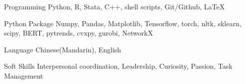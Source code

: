 

\begin{cvskills}

  \cvskill
    {Programming} %
    {Python, R, Stata, C++, shell scripts, Git/Github, \LaTeX} %

  \cvskill
    {Python Package} %
    {Numpy, Pandas, Matplotlib, Tensorflow, torch, nltk, sklearn, scipy, BERT, pytrends, cvxpy,
    gurobi, NetworkX}
    
  \cvskill
    {Language} %
    {Chinese(Mandarin), English} %
    
  \cvskill
    {Soft Skills} %
    {Interpersonal coordination, Leadership, Curiosity, Passion, Task Management} %

\end{cvskills}
